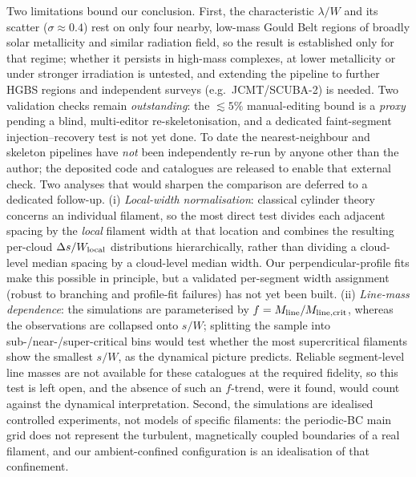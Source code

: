 \documentclass[usenatbib,twoside,twocolumn]{mnras}
\begin{document}
Two limitations bound our conclusion. First, the characteristic $\lambda/W$ and its scatter ($\sigma\approx0.4$) rest on only four nearby, low-mass Gould Belt regions of broadly solar metallicity and similar radiation field, so the result is established only for that regime; whether it persists in high-mass complexes, at lower metallicity or under stronger irradiation is untested, and extending the pipeline to further HGBS regions and independent surveys (e.g.\ JCMT/SCUBA-2) is needed. Two validation checks remain \emph{outstanding}: the $\lesssim5\%$ manual-editing bound is a \emph{proxy} pending a blind, multi-editor re-skeletonisation, and a dedicated faint-segment injection--recovery test is not yet done. To date the nearest-neighbour and skeleton pipelines have \emph{not} been independently re-run by anyone other than the author; the deposited code and catalogues are released to enable that external check. Two analyses that would sharpen the comparison are deferred to a dedicated follow-up. (i) \emph{Local-width normalisation}: classical cylinder theory concerns an individual filament, so the most direct test divides each adjacent spacing by the \emph{local} filament width at that location and combines the resulting per-cloud $\Delta s/W_{\rm local}$ distributions hierarchically, rather than dividing a cloud-level median spacing by a cloud-level median width. Our perpendicular-profile fits make this possible in principle, but a validated per-segment width assignment (robust to branching and profile-fit failures) has not yet been built. (ii) \emph{Line-mass dependence}: the simulations are parameterised by $f=M_{\rm line}/M_{\rm line,crit}$, whereas the observations are collapsed onto $s/W$; splitting the sample into sub-/near-/super-critical bins would test whether the most supercritical filaments show the smallest $s/W$, as the dynamical picture predicts. Reliable segment-level line masses are not available for these catalogues at the required fidelity, so this test is left open, and the absence of such an $f$-trend, were it found, would count against the dynamical interpretation. Second, the simulations are idealised controlled experiments, not models of specific filaments: the periodic-BC main grid does not represent the turbulent, magnetically coupled boundaries of a real filament, and our ambient-confined configuration is an idealisation of that confinement.
\end{document}
